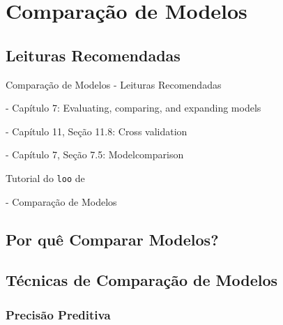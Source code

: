 \section{Comparação de Modelos}

\subsection{Leituras Recomendadas}
\begin{frame}{Comparação de Modelos - Leituras Recomendadas}
    \begin{vfilleditems}
        \item \textcite{gelman2013bayesian} - Capítulo 7: Evaluating, comparing, and expanding models
        \item \textcite{gelman2020regression} - Capítulo 11, Seção 11.8: Cross validation
        \item \textcite{mcelreath2020statistical} - Capítulo 7, Seção 7.5: Modelcomparison
        \item \textcite{vehtariPracticalBayesianModel2015}
        \item Tutorial do \texttt{loo} de \textcite{loo}
        \item \textcite{storopoli2021estatisticabayesianaR} - Comparação de Modelos
        \item \textcite{spiegelhalter2002bayesian}
        \item \textcite{van2005dic}
        \item \textcite{watanabe2010asymptotic}
        \item \textcite{gelfand1996model}
        \item \textcite{watanabe2010asymptotic}
        \item \textcite{geisser1979predictive}
    \end{vfilleditems}
\end{frame}

\subsection{Por quê Comparar Modelos?}

\subsection{Técnicas de Comparação de Modelos}
\subsubsection{Precisão Preditiva}
